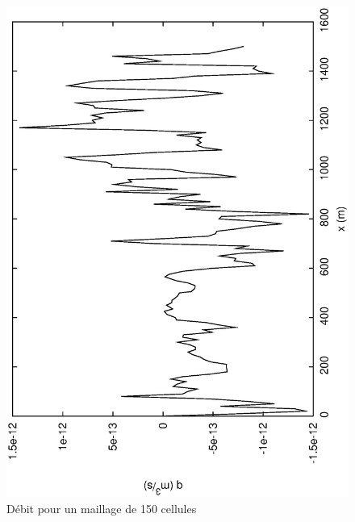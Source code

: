 \documentclass[a4paper,10pt]{article}
\begin{document}
\begin{figure}
 \begin{center}
  \includegraphics[angle=270,width=15cm]{Q10.eps}
  \caption{Débit pour un maillage de 150 cellules}
  \label{fig3}
 \end{center}
\end{figure}
\end{document}

